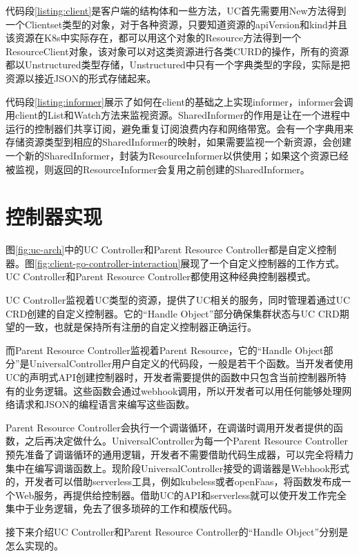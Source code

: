 \documentclass[macfonts,master]{njuthesis}
\begin{document}
代码段\ref{listing:client}是客户端的结构体和一些方法，UC首先需要用New方法得到一个Clientset类型的对象，对于各种资源，只要知道资源的apiVersion和kind并且该资源在K8s中实际存在，都可以用这个对象的Resource方法得到一个ResourceClient对象，该对象可以对这类资源进行各类CURD的操作，所有的资源都以Unstructured类型存储，Unstructured中只有一个字典类型的字段，实际是把资源以接近JSON的形式存储起来。

代码段\ref{listing:informer}展示了如何在client的基础之上实现informer，informer会调用client的List和Watch方法来监视资源。SharedInformer的作用是让在一个进程中运行的控制器们共享订阅，避免重复订阅浪费内存和网络带宽。会有一个字典用来存储资源类型到相应的SharedInformer的映射，如果需要监视一个新资源，会创建一个新的SharedInformer，封装为ResourceInformer以供使用；如果这个资源已经被监视，则返回的ResourceInformer会复用之前创建的SharedInformer。

\section{控制器实现}

图\ref{fig:uc-arch}中的UC Controller和Parent Resource Controller都是自定义控制器。图\ref{fig:client-go-controller-interaction}展现了一个自定义控制器的工作方式。UC Controller和Parent Resource Controller都使用这种经典控制器模式。

UC Controller监视着UC类型的资源，提供了UC相关的服务，同时管理着通过UC CRD创建的自定义控制器。它的``Handle Object''部分确保集群状态与UC CRD期望的一致，也就是保持所有注册的自定义控制器正确运行。

而Parent Resource Controller监视着Parent Resource，它的``Handle Object部分''是UniversalController用户自定义的代码段，一般是若干个函数。当开发者使用UC的声明式API创建控制器时，开发者需要提供的函数中只包含当前控制器所特有的业务逻辑。这些函数会通过webhook调用，所以开发者可以用任何能够处理网络请求和JSON的编程语言来编写这些函数。

Parent Resource Controller会执行一个调谐循环，在调谐时调用开发者提供的函数，之后再决定做什么。UniversalController为每一个Parent Resource Controller预先准备了调谐循环的通用逻辑，开发者不需要借助代码生成器，可以完全将精力集中在编写调谐函数上。现阶段UniversalController接受的调谐器是Webhook形式的，开发者可以借助serverless工具，例如kubeless或者openFaas，将函数发布成一个Web服务，再提供给控制器。借助UC的API和serverless就可以使开发工作完全集中于业务逻辑，免去了很多琐碎的工作和模版代码。


接下来介绍UC Controller和Parent Resource Controller的``Handle Object''分别是怎么实现的。
\end{document}
